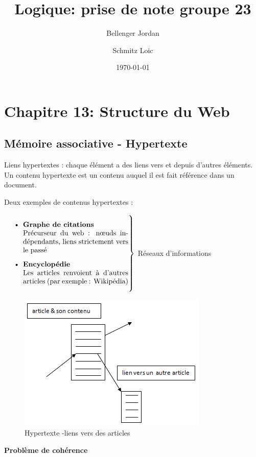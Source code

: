 \documentclass{article}
\title{Logique: prise de note groupe 23}
\author{Bellenger Jordan \and Schmitz Loic }
\date{\today}
\begin{document}
\maketitle
\section{Chapitre 13: Structure du Web}


\subsection{Mémoire associative - Hypertexte}

Liens hypertextes : chaque élément a des liens vers et depuis d'autres éléments. Un contenu hypertexte est un contenu auquel il est fait référence dans un document.

\vspace{0.5cm}
Deux exemples de contenus hypertextes :

$
\left. 
\parbox{0.5\linewidth}{
\begin{itemize}
\item \textbf{Graphe de citations} \\
		Précurseur du web : nœuds indépendants, liens strictement vers le passé
\item \textbf{Encyclopédie} \\
		Les articles renvoient à d'autres articles (par exemple : Wikipédia)
\end{itemize}
}%
\right\}
$ Réseaux d'informations




\begin{figure}[!h]
\centering
\includegraphics{images/23_image1.png}
\caption{Hypertexte -liens vers des articles}
\label{fig:cfc}
\end{figure}

\textbf{Problème de cohérence}
\end{document}

